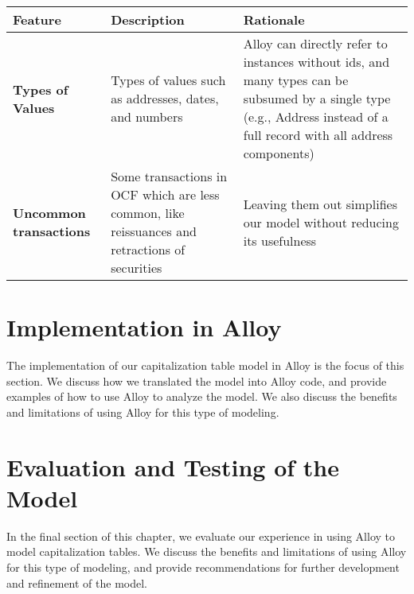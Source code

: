 \begin{tabular}[h!]{|p{5cm}|p{5cm}|p{5cm}|}
\hline
\textbf{Feature}               & \textbf{Description}                                                                           & \textbf{Rationale}                                                                                                                                                      \\
\hline
\textbf{Types of Values}       & Types of values such as addresses, dates, and numbers                                          & Alloy can directly refer to instances without ids, and many types can be subsumed by a single type (e.g., Address instead of a full record with all address components) \\
\hline
\textbf{Uncommon transactions} & Some transactions in OCF which are less common, like reissuances and retractions of securities & Leaving them out simplifies our model without reducing its usefulness                                                                                                   \\
\hline
\end{tabular}


\section{Implementation in Alloy}

The implementation of our capitalization table model in Alloy is the focus of this section. We discuss how we translated the model into Alloy code, and provide examples of how to use Alloy to analyze the model. We also discuss the benefits and limitations of using Alloy for this type of modeling.

\section{Evaluation and Testing of the Model}

In the final section of this chapter, we evaluate our experience in using Alloy to model capitalization tables. We discuss the benefits and limitations of using Alloy for this type of modeling, and provide recommendations for further development and refinement of the model.

